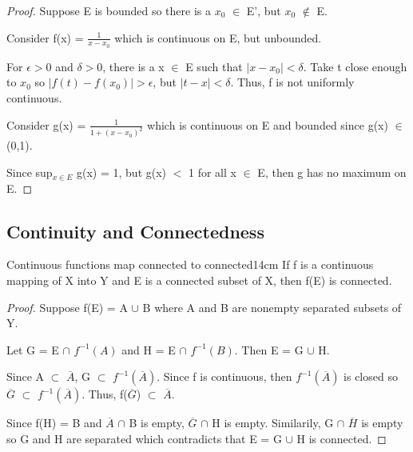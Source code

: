     \begin{proof}
        Suppose E is bounded so there is a $x_0$ $\in$ E', but $x_0$ $\not \in$ E.

        Consider f(x) = $\frac{1}{x - x_0}$ which is continuous on E, but unbounded.

        For $\epsilon > 0$ and $\delta > 0$, there is a x $\in$ E such that
        $|x - x_0| < \delta$.
        Take t close enough to $x_0$ so $|f(t) - f(x_0)| > \epsilon$,
        but $|t - x| < \delta$.
        Thus, f is not uniformly continuous.

        \vspace{0.2cm}

        Consider g(x) = $\frac{1}{1 + (x - x_0)^2}$ which is continuous on E
        and bounded since g(x) $\in$ (0,1).

        Since sup$_{x \in E}$ g(x) = 1, but g(x) $<$ 1 for all x $\in$ E, then
        g has no maximum on E.
    \end{proof}

    \vspace{0.5cm}





\subsection{ Continuity and Connectedness }

    \begin{wtheorem}{Continuous functions map connected to connected}{14cm}
        If f is a continuous mapping of X into Y and E is a connected
        subset of X, then f(E) is connected.
    \end{wtheorem}

    \begin{proof}
        Suppose f(E) = A $\cup$ B where A and B are nonempty separated
        subsets of Y.
        
        Let G = E $\cap$ $f^{-1}(A)$ and H = E $\cap$ $f^{-1}(B)$.
        Then E = G $\cup$ H.

        Since A $\subset$ $\overline{A}$, G $\subset$ $f^{-1}(\overline{A})$.
        Since f is continuous, then $f^{-1}(\overline{A})$ is closed so
        $\overline{G}$ $\subset$ $f^{-1}(\overline{A})$.
        Thus, f($\overline{G}$) $\subset$ $\overline{A}$.

        Since f(H) = B and $\overline{A}$ $\cap$ B is empty,
        $\overline{G}$ $\cap$ H is empty.
        Similarily, G $\cap$ $\overline{H}$ is empty so G and H are separated
        which contradicts that E = G $\cup$ H is connected.
    \end{proof}

